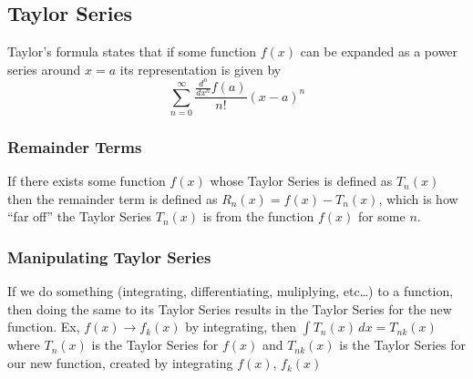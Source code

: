 \documentclass[10pt,landscape,letterpaper]{cheatsheet}
\begin{document}
\subsection*{Taylor Series}
Taylor's formula states that if some function $f(x)$ can be expanded as a power series around $x=a$
its representation is given by $$\sum_{n=0}^{\infty}\frac{\frac{d^n}{dx^n}f(a)}{n!}(x-a)^n$$
\subsubsection*{Remainder Terms}
If there exists some function $f(x)$ whose Taylor Series is defined as $T_n(x)$ then the remainder term is
defined as $R_n(x)=f(x)-T_n(x)$, which is how ``far off'' the Taylor Series $T_n(x)$ is from the function $f(x)$
for some $n$.
\subsubsection*{Manipulating Taylor Series}
If we do something (integrating, differentiating, muliplying, etc\dots) to a function, then doing the same to its
Taylor Series results in the Taylor Series for the new function. Ex, $f(x)\to f_k(x)$ by integrating, then
$\int T_n(x) \,dx= T_{nk}(x)$ where $T_n(x)$ is the Taylor Series for $f(x)$ and $T_{nk}(x)$ is the Taylor Series for 
our new function, created by integrating $f(x)$, $f_k(x)$
\end{document}
